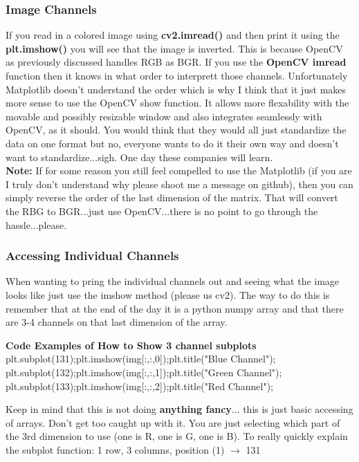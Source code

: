 \documentclass[fleqn]{article}
\begin{document}
    \subsubsection{Image Channels}
    If you read in a colored image using \textbf{cv2.imread()} and then print it using the \textbf{plt.imshow()} you will see that the image is inverted. This is because OpenCV as previously discussed handles RGB as BGR. If you use the \textbf{OpenCV imread} function then it knows in what order to interprett those channels. Unfortunately Matplotlib doesn't understand the order which is why I think that it just makes more sense to use the OpenCV show function. It allows more flexability with the movable and possibly resizable window and also integrates seamlessly with OpenCV, as it should. You would think that they would all just standardize the data on one format but no, everyone wants to do it their own way and doesn't want to standardize...sigh. One day these companies will learn.\\
    \textbf{Note:} If for some reason you still feel compelled to use the Matplotlib (if you are I truly don't understand why please shoot me a message on github), then you can simply reverse the order of the last dimension of the matrix. That will convert the RBG to BGR...just use OpenCV...there is no point to go through the hassle...please.

    \subsubsection{Accessing Individual Channels}
    When wanting to pring the individual channels out and seeing what the image looks like just use the imshow method (please us cv2). The way to do this is remember that at the end of the day it is a python numpy array and that there are 3-4 channels on that last dimension of the array.
    \begin{center}
      \textbf{Code Examples of How to Show 3 channel subplots}\\
      plt.subplot(131);plt.imshow(img[:,:,0]);plt.title("Blue Channel");\\
      plt.subplot(132);plt.imshow(img[:,:,1]);plt.title("Green Channel");\\
      plt.subplot(133);plt.imshow(img[:,:,2]);plt.title("Red Channel");\\
    \end{center}
    Keep in mind that this is not doing \textbf{anything fancy}... this is
    just basic accessing of arrays. Don't get too caught up with it. You are just selecting which part of the 3rd dimension to use (one is R, one is G, one is B). To really quickly explain the subplot function:
    1 row, 3 columns, position (1) $\rightarrow$ 131\\ \\
\end{document}
